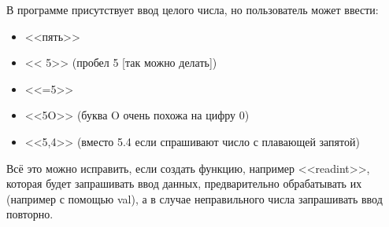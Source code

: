 В программе присутствует ввод целого числа,
но пользователь может ввести:
\begin{itemize}
\item <<пять>>
\item << 5>> (пробел 5 [так можно делать])
\item <<=5>>
\item <<5O>> (буква O очень похожа на цифру 0)
\item <<5,4>> (вместо 5.4 если спрашивают число с плавающей запятой)
\end{itemize}

Всё это можно исправить, если создать функцию, например <<readint>>,
которая будет запрашивать ввод данных, предварительно обрабатывать их
(например с помощью val), а в случае неправильного числа запрашивать
ввод повторно.








